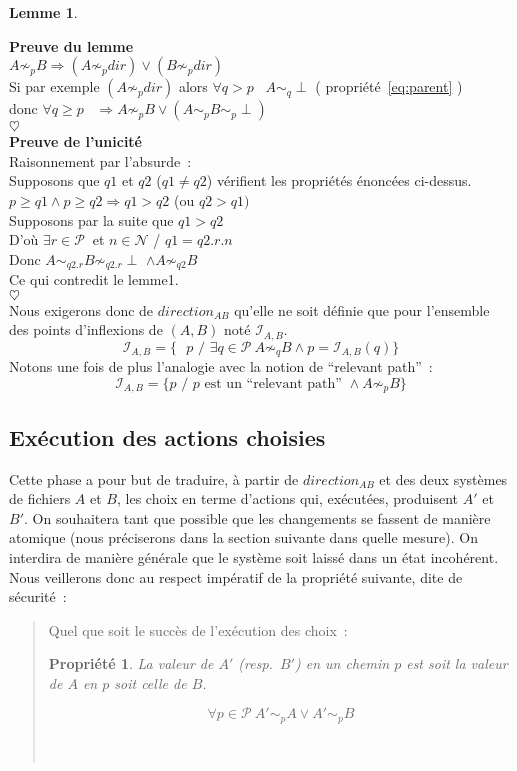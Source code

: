 \documentclass[11pt]{report}
\newtheorem{lemme}{Lemme}
\newtheorem{propri}{Propri\'et\'e}
\newcommand{\path}{\ensuremath{\mathcal{P}}}
\newcommand{\infl}[2]{\ensuremath{\mathcal{I}_{#1,#2}}}
\newcommand{\preuve}[2]{\textbf{Preuve #1} \\
#2\\
$\heartsuit$\\}
\newcommand{\prop}[3]{
\begin{propri}
#1
\end{propri}
\begin{equation} \label{#2}
#3
\end{equation}\\}
\begin{document}
{\begin{lemme}
\end{lemme}
\preuve{du lemme}{
$A \not\sim_{p} B \Rightarrow (A \not\sim_{p} dir) \vee
(B \not\sim_{p} dir)$\\
Si par exemple $( A \not\sim_{p} dir)$ alors $\forall q > p$ \ $A \sim_{q} 
\perp$ ( propri\'et\'e~\ref{eq:parent} )\\
donc $\forall q \geq p$ \ $\Rightarrow A \not\sim_{p} B \vee 
(A \sim_{p} B \sim_{p} \perp)$}
\preuve{de l'unicit\'e}{
Raisonnement par l'absurde~:\\
Supposons que $q1$ et $q2$ ($q1 \neq q2$) v\'erifient les propri\'et\'es \'enonc\'ees ci-dessus.\\
$p \geq q1 \wedge p \geq q2 \Rightarrow q1 > q2$ (ou $q2 > q1)$\\
Supposons par la suite que $q1 > q2$\\
D'o\`u $\exists r \in \path\ $ et $n \in \mathcal{N}$ / $q1 = q2.r.n$\\
Donc $A \sim_{q2.r} B \not\sim_{q2.r} \perp$ $\wedge A \not\sim_{q2} B$\\
Ce qui contredit le lemme1.
}
Nous exigerons donc de $\mathit{direction}_{AB}$ qu'elle ne soit d\'efinie que pour
l'ensemble des points d'inflexions de $(A, B)$ not\'e \infl{A}{B}.
\begin{equation}
\infl{A}{B} = \{ \mbox{ $p$ / } \exists q \in \path\ A \not\sim_{q} B 
\wedge p = \infl{A}{B}(q) \}
\end{equation}
Notons une fois de plus l'analogie avec la notion de ``relevant path''~:\\
\begin{equation}
\infl{A}{B} = \{ p \mbox{\ /  $p$ est un ``relevant path'' } \wedge A
\not\sim_{p} B\}
\end{equation}
\subsection{Ex\'ecution des actions choisies}
Cette phase a pour but de traduire, \`a partir de $\mathit{direction}_{AB}$ 
et des deux syst\`emes de fichiers $A$ et $B$, les choix en terme d'actions 
qui, ex\'ecut\'ees, produisent $A'$ et $B'$.
On souhaitera tant que possible que les changements se fassent de mani\`ere
atomique (nous pr\'eciserons dans la section suivante dans quelle mesure).
On interdira de mani\`ere g\'en\'erale que le syst\`eme soit laiss\'e dans un
\'etat incoh\'erent. Nous veillerons donc au respect imp\'eratif de la 
propri\'et\'e suivante, dite de s\'ecurit\'e~:
\begin{quote}
Quel que soit le succ\`es de l'ex\'ecution des choix~:
\prop{
La valeur de $A'$ (resp.\ $B'$) en un chemin $p$ est soit la valeur de $A$ en 
$p$ soit celle de $B$.
}
{prop:cohe}
{\forall p \in \path\ A' \sim_{p} A \vee A' \sim_{p} B}
\\
\end{quote}
}
\end{document}
